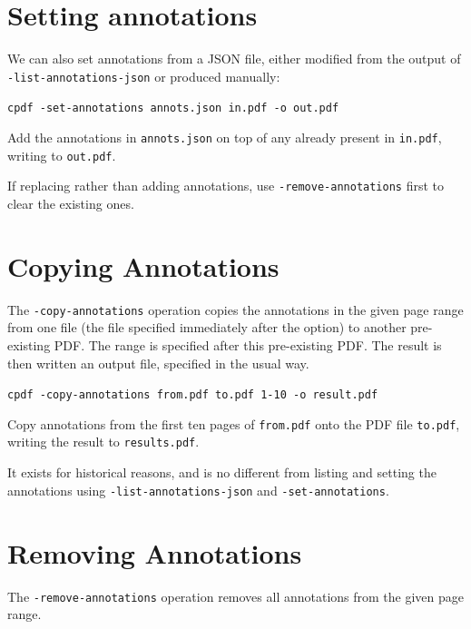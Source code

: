 \documentclass{book}
\begin{document}
\section{Setting annotations}

We can also set annotations from a JSON file, either modified from the output of \texttt{-list-annotations-json} or produced manually:

  \begin{framed}
    \noindent\small\verb!cpdf -set-annotations annots.json in.pdf -o out.pdf !
    
    \vspace{2.5mm}
    \noindent Add the annotations in \texttt{annots.json} on top of any already present in \texttt{in.pdf}, writing to \texttt{out.pdf}.

  \end{framed}

\noindent If replacing rather than adding annotations, use \texttt{-remove-annotations} first to clear the existing ones.


  \section{Copying Annotations}
  The \texttt{-copy-annotations} operation copies the annotations in the given
page range from one file (the file specified immediately after the option) to
another pre-existing PDF. The range is specified after this pre-existing PDF.
The result is then written an output file, specified in the usual way.
  \begin{framed}
    \noindent\small\verb!cpdf -copy-annotations from.pdf to.pdf 1-10 -o result.pdf !
    
    \vspace{2.5mm}
    \noindent Copy annotations from the first ten pages of \texttt{from.pdf}
onto the PDF file \texttt{to.pdf}, writing the result to \texttt{results.pdf}.

  \end{framed}

\noindent It exists for historical reasons, and is no different from listing and setting the annotations using \texttt{-list-annotations-json} and \texttt{-set-annotations}. 

  \section{Removing Annotations}
  The \texttt{-remove-annotations} operation removes all annotations from the
given page range.
\end{document}
